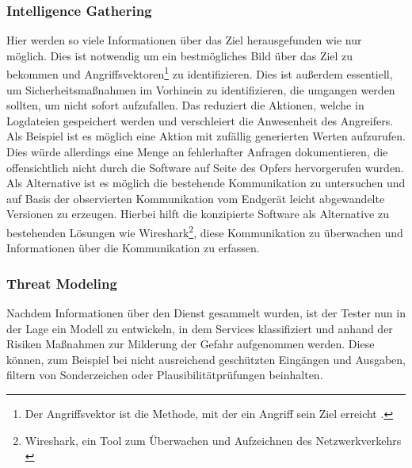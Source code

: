     \subsubsection{\glqq Intelligence Gathering\grqq{}} \label{IntelligenceGathering}
        Hier werden so viele Informationen über das Ziel herausgefunden wie nur möglich. Dies ist notwendig um ein bestmögliches Bild über das Ziel zu bekommen und Angriffsvektoren\footnote{Der Angriffsvektor ist die Methode, mit der ein Angriff sein Ziel erreicht \cite{HANSMAN200531}.} zu identifizieren. Dies ist außerdem essentiell, um Sicherheitsmaßnahmen im Vorhinein zu identifizieren, die umgangen werden sollten, um nicht sofort aufzufallen. Das reduziert die Aktionen, welche in Logdateien gespeichert werden und verschleiert die Anwesenheit des Angreifers. Als Beispiel ist es möglich eine Aktion mit zufällig generierten Werten aufzurufen. Dies würde allerdings eine Menge an fehlerhafter Anfragen dokumentieren, die offensichtlich nicht durch die Software auf Seite des Opfers hervorgerufen wurden. Als Alternative ist es möglich die bestehende Kommunikation zu untersuchen und auf Basis der observierten Kommunikation vom Endgerät leicht abgewandelte Versionen zu erzeugen. Hierbei hilft die konzipierte Software als Alternative zu bestehenden Lösungen wie Wireshark\footnote{Wireshark, ein Tool zum Überwachen und Aufzeichnen des Netzwerkverkehrs \cite{SandersChris2017Ppa}}, diese Kommunikation zu überwachen und Informationen über die Kommunikation zu erfassen.
    \subsubsection{\glqq Threat Modeling\grqq{}}
        Nachdem Informationen über den Dienst gesammelt wurden, ist der Tester nun in der Lage ein Modell zu entwickeln, in dem Services klassifiziert und anhand der Risiken Maßnahmen zur Milderung der Gefahr aufgenommen werden. Diese können, zum Beispiel bei nicht ausreichend geschützten Eingängen und Ausgaben, filtern von Sonderzeichen oder Plausibilitätprüfungen beinhalten.
